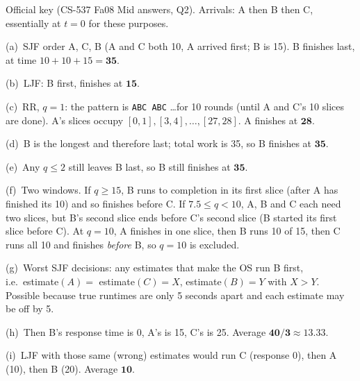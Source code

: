 \documentclass[11pt,a4paper]{article}
\newenvironment{Sol}{%
  \begin{tcolorbox}[sboxstyle, title={Solution}]%
}{%
  \end{tcolorbox}\vspace{0.35em}%
}
\begin{document}
\begin{Sol}
Official key (CS-537 Fa08 Mid answers, Q2). Arrivals: A then B then C, essentially at $t=0$ for these purposes.

(a)~SJF order A, C, B (A and C both 10, A arrived first; B is 15). B finishes last, at time $10+10+15=\mathbf{35}$.

(b)~LJF: B first, finishes at $\mathbf{15}$.

(c)~RR, $q=1$: the pattern is \texttt{ABC ABC} \ldots for 10 rounds (until A and C's 10 slices are done). A's slices occupy $[0,1],[3,4],\ldots,[27,28]$. A finishes at $\mathbf{28}$.

(d)~B is the longest and therefore last; total work is 35, so B finishes at $\mathbf{35}$.

(e)~Any $q\le 2$ still leaves B last, so B still finishes at $\mathbf{35}$.

(f)~Two windows. If $q\ge 15$, B runs to completion in its first slice (after A has finished its 10) and so finishes before C. If $7.5 \le q < 10$, A, B and C each need two slices, but B's second slice ends before C's second slice (B started its first slice before C). At $q=10$, A finishes in one slice, then B runs 10 of 15, then C runs all 10 and finishes \emph{before} B, so $q=10$ is excluded.

(g)~Worst SJF decisions: any estimates that make the OS run B first, i.e.\ estimate$(A)=$ estimate$(C)=X$, estimate$(B)=Y$ with $X>Y$. Possible because true runtimes are only 5 seconds apart and each estimate may be off by 5.

(h)~Then B's response time is 0, A's is 15, C's is 25. Average $\mathbf{40/3 \approx 13.33}$.

(i)~LJF with those same (wrong) estimates would run C (response 0), then A (10), then B (20). Average $\mathbf{10}$.
\end{Sol}
\end{document}
